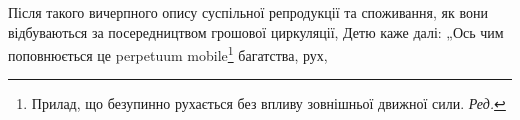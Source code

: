 Після такого вичерпного опису суспільної репродукції та споживання, як вони відбуваються за
посередництвом грошової циркуляції, Детю каже далі: „Ось чим поповнюється це perpetuum mobile\footnote*{Прилад, що безупинно рухається без впливу зовнішньої движної сили. \emph{Ред.}}
багатства, рух,
\parbreak{}  %
